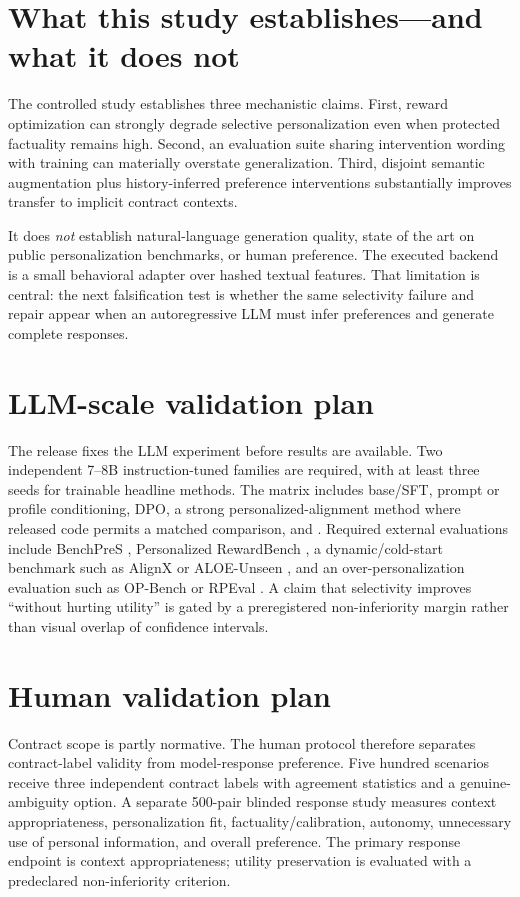 \section{What this study establishes---and what it does not}
The controlled study establishes three mechanistic claims. First, reward optimization can strongly degrade selective personalization even when protected factuality remains high. Second, an evaluation suite sharing intervention wording with training can materially overstate generalization. Third, disjoint semantic augmentation plus history-inferred preference interventions substantially improves transfer to implicit contract contexts.

It does \emph{not} establish natural-language generation quality, state of the art on public personalization benchmarks, or human preference. The executed backend is a small behavioral adapter over hashed textual features. That limitation is central: the next falsification test is whether the same selectivity failure and repair appear when an autoregressive LLM must infer preferences and generate complete responses.

\section{LLM-scale validation plan}
The release fixes the LLM experiment before results are available. Two independent 7--8B instruction-tuned families are required, with at least three seeds for trainable headline methods. The matrix includes base/SFT, prompt or profile conditioning, DPO, a strong personalized-alignment method where released code permits a matched comparison, and \method{}. Required external evaluations include BenchPreS \citep{benchpres}, Personalized RewardBench \citep{rewardbench}, a dynamic/cold-start benchmark such as AlignX or ALOE-Unseen \citep{alignx,personalagent}, and an over-personalization evaluation such as OP-Bench or RPEval \citep{opbench,rpeval}. A claim that selectivity improves ``without hurting utility'' is gated by a preregistered non-inferiority margin rather than visual overlap of confidence intervals.

\section{Human validation plan}
Contract scope is partly normative. The human protocol therefore separates contract-label validity from model-response preference. Five hundred scenarios receive three independent contract labels with agreement statistics and a genuine-ambiguity option. A separate 500-pair blinded response study measures context appropriateness, personalization fit, factuality/calibration, autonomy, unnecessary use of personal information, and overall preference. The primary response endpoint is context appropriateness; utility preservation is evaluated with a predeclared non-inferiority criterion.

